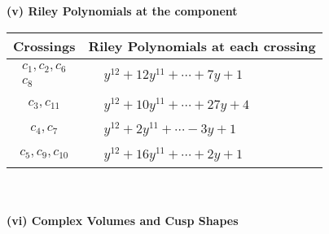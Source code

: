 \documentclass[1p]{elsarticle_modified}
\theoremstyle{definition}
\begin{document}
\newpage\renewcommand{\arraystretch}{1}
\flushleft \textbf{(v) Riley Polynomials at the component}\newline \\
\begin{tabular}{m{50pt}|m{274pt}}
Crossings & \hspace{64pt}Riley Polynomials at each crossing \\
\hline $$\begin{aligned}c_{1},c_{2},c_{6}\\c_{8}\end{aligned}$$&$\begin{aligned}
&y^{12}+12 y^{11}+\cdots+7 y+1
\end{aligned}$\\
\hline $$\begin{aligned}c_{3},c_{11}\end{aligned}$$&$\begin{aligned}
&y^{12}+10 y^{11}+\cdots+27 y+4
\end{aligned}$\\
\hline $$\begin{aligned}c_{4},c_{7}\end{aligned}$$&$\begin{aligned}
&y^{12}+2 y^{11}+\cdots-3 y+1
\end{aligned}$\\
\hline $$\begin{aligned}c_{5},c_{9},c_{10}\end{aligned}$$&$\begin{aligned}
&y^{12}+16 y^{11}+\cdots+2 y+1
\end{aligned}$\\
\hline
\end{tabular}\\~\\
\newpage\flushleft \textbf{(vi) Complex Volumes and Cusp Shapes}
\end{document}
